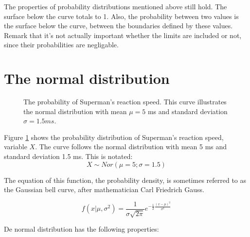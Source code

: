 The properties of probability distributions mentioned above still hold. The surface below the curve totals to 1. Also, the probability between two values is the surface below the curve, between the boundaries defined by these values. Remark that it's not actually important whether the limits are included or not, since their probabilities are negligable.

\section{The normal distribution}
\label{sec:normal-distribution}

\begin{figure}
\centering
{}
\caption{The probability of Superman's reaction speed. This curve illustrates the normal distribution with mean $\mu = 5$ ms and standard deviation $\sigma = 1.5 ms.$}
\label{fig:verdelingReactievermogen}
\end{figure}

Figure \ref{fig:verdelingReactievermogen} shows the probability distribution of Superman's reaction speed, variable $X$. The curve follows the normal distribution with mean 5 ms and standard deviation 1.5 ms. This is notated:
\[ X  \sim Nor(\mu = 5; \sigma = 1.5) \]

The equation of this function, the probability density, is sometimes referred to as the Gaussian bell curve, after mathematician Carl Friedrich Gauss.

\begin{equation}
  f(x|\mu, \sigma^2) = \frac{1}{\sigma \sqrt{2\pi}} e^{-\frac{1}{2} \frac{(x - \mu)^{2}}{\sigma^{2}}}
  \label{eq:normalFunction}
\end{equation}

De normal distribution has the following properties:

